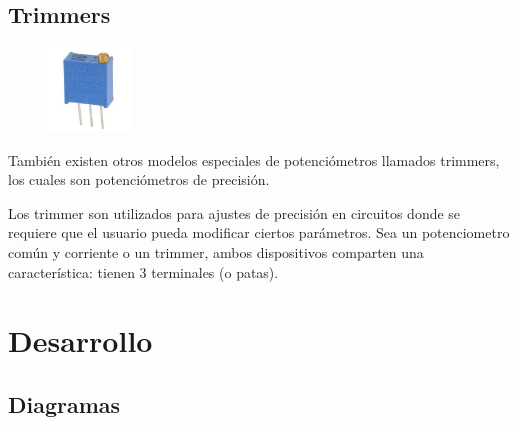 \documentclass[12pt, fleqn]{article}                            %
\theoremstyle{break}                                            %
\begin{document}
        \subsection{Trimmers}

            \begin{figure}
                \centering
                \includegraphics[width=0.20\textwidth]{Trimmer}
            \end{figure}

            También existen otros modelos especiales de potenciómetros llamados trimmers,
            los cuales son potenciómetros de precisión.

            Los trimmer son utilizados para ajustes de precisión en circuitos donde se
            requiere que el usuario pueda modificar ciertos parámetros. Sea un potenciometro
            común y corriente o un trimmer, ambos dispositivos comparten una característica:
            tienen 3 terminales (o patas).







\clearpage
\section{Desarrollo}


    \subsection{Diagramas}
\end{document}
